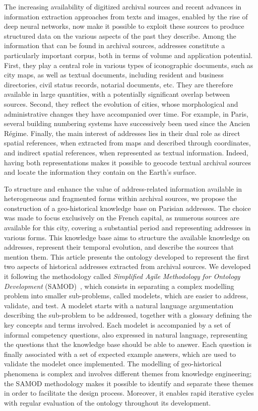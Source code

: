 The increasing availability of digitized archival sources and recent advances in information extraction approaches from texts and images, enabled by the rise of deep neural networks, now make it possible to exploit these sources to produce structured data on the various aspects of the past they describe.
Among the information that can be found in archival sources, addresses constitute a particularly important corpus, both in terms of volume and application potential.
First, they play a central role in various types of iconographic documents, such as city maps, as well as textual documents, including resident and business directories, civil status records, notarial documents, etc.
They are therefore available in large quantities, with a potentially significant overlap between sources.
Second, they reflect the evolution of cities, whose morphological and administrative changes they have accompanied over time.
For example, in Paris, several building numbering systems have successively been used since the Ancien Régime.
Finally, the main interest of addresses lies in their dual role as direct spatial references, when extracted from maps and described through coordinates, and indirect spatial references, when represented as textual information.
Indeed, having both representations makes it possible to geocode textual archival sources and locate the information they contain on the Earth's surface.

To structure and enhance the value of address-related information available in heterogeneous and fragmented forms within archival sources, we propose the construction of a geo-historical knowledge base on Parisian addresses.
The choice was made to focus exclusively on the French capital, as numerous sources are available for this city, covering a substantial period and representing addresses in various forms.
This knowledge base aims to structure the available knowledge on addresses, represent their temporal evolution, and describe the sources that mention them.
This article presents the ontology developed to represent the first two aspects of historical addresses extracted from archival sources.
We developed it following the methodology called \textit{Simplified Agile Methodology for Ontology Development} (SAMOD)~\cite{peroni_simplified_2017}, which consists in separating a complex modelling problem into smaller sub-problems, called modelets, which are easier to address, validate, and test.
A modelet starts with a natural language argumentation describing the sub-problem to be addressed, together with a glossary defining the key concepts and terms involved.
Each modelet is accompanied by a set of informal competency questions, also expressed in natural language, representing the questions that the knowledge base should be able to answer.
Each question is finally associated with a set of expected example answers, which are used to validate the modelet once implemented.
The modelling of geo-historical phenomena is complex and involves different themes from knowledge engineering; the SAMOD methodology makes it possible to identify and separate these themes in order to facilitate the design process.
Moreover, it enables rapid iterative cycles with regular evaluation of the ontology throughout its development.

